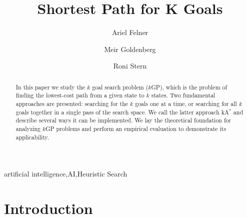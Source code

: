 \documentclass{aicom2e}
\newcommand{\kgs}{$k$GP}
\newcommand{\kastar}{kA$^*$}
\begin{document}
\begin{frontmatter}                           %
%
\title{Shortest Path for K Goals}
\maketitle
%
\author[]{Ariel Felner}
\address{Ben Gurion University of the Negev\\ Be'er Sheva, Israel\\
    E-mail: felner@bgu.ac.il}

\author[]{Meir Goldenberg}
\address{The Jerusalem College of Technology\\ Jerusalem, Israel\\
    E-mail: mgoldenbe@gmail.com}
\author[]{Roni Stern}
\address{Ben Gurion University of the Negev\\ Be'er Sheva, Israel\\
    E-mail: roni.stern@gmail.com}

\begin{abstract}
    In this paper we study the $k$ goal search problem (\kgs{}),
    which is the problem of finding the lowest-cost path
    from a given state to $k$ states. Two fundamental approaches
    are presented: searching for the $k$ goals one at a time,
    or searching for all $k$ goals together in a single pass of the
    search space. We call the latter approach \kastar{}
    and describe several ways it can be implemented.
    We lay the theoretical foundation for analyzing \kgs{} problems
    and perform an empirical evaluation to demonstrate
    its applicability.
\end{abstract}

\begin{keyword}
artificial intelligence\sep AI\sep Heuristic Search
\end{keyword}
%
\end{frontmatter}

\section{Introduction}

\end{document}
